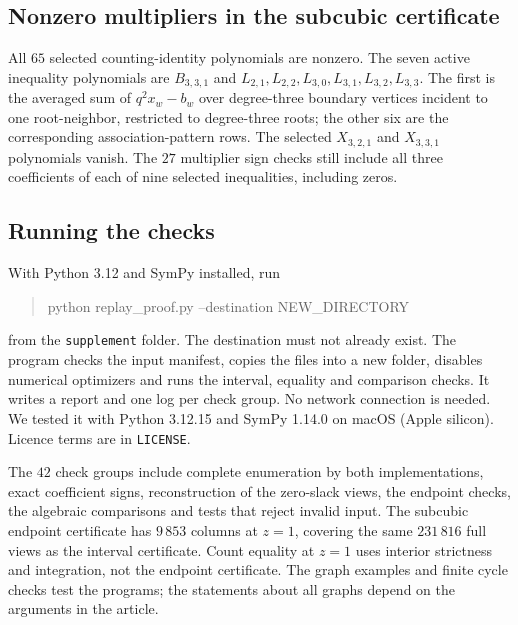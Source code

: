 \documentclass[11pt]{article}
\newcommand{\file}[1]{\nolinkurl{#1}}
\begin{document}
\subsection{Nonzero multipliers in the subcubic certificate}
All $65$ selected counting-identity polynomials are nonzero. The seven active inequality polynomials are $B_{3,3,1}$ and $L_{2,1},L_{2,2},L_{3,0},L_{3,1},L_{3,2},L_{3,3}$. The first is the averaged sum of $q^2x_w-b_w$ over degree-three boundary vertices incident to one root-neighbor, restricted to degree-three roots; the other six are the corresponding association-pattern rows. The selected $X_{3,2,1}$ and $X_{3,3,1}$ polynomials vanish. The $27$ multiplier sign checks still include all three coefficients of each of nine selected inequalities, including zeros.

\subsection{Running the checks}
With Python 3.12 and SymPy installed, run
\begin{quote}\ttfamily\small
python replay\_proof.py --destination NEW\_DIRECTORY
\end{quote}
from the \file{supplement} folder. The destination must not already exist. The program checks the input manifest, copies the files into a new folder, disables numerical optimizers and runs the interval, equality and comparison checks. It writes a report and one log per check group. No network connection is needed. We tested it with Python 3.12.15 and SymPy 1.14.0 on macOS (Apple silicon). Licence terms are in \file{LICENSE}.

The $42$ check groups include complete enumeration by both implementations, exact coefficient signs, reconstruction of the zero-slack views, the endpoint checks, the algebraic comparisons and tests that reject invalid input. The subcubic endpoint certificate has $9\,853$ columns at $z=1$, covering the same $231\,816$ full views as the interval certificate. Count equality at $z=1$ uses interior strictness and integration, not the endpoint certificate. The graph examples and finite cycle checks test the programs; the statements about all graphs depend on the arguments in the article.
\end{document}
